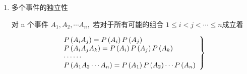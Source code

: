 \begin{enumerate}[1、]
\begin{enumerate}[1)、]
		 	{\bf 推论1：}  若事件独立，且 $ \rm P(B) > 0 $ 则 $ \rm P(A\mid B) = P(A) $
			\begin{myproof}
				由条件概率定义 $ P(A \mid B)=\dfrac{P(A B)}{P(B)}=\dfrac{P(A) P(B)}{P(B)}=P(A) $
			\end{myproof}
		 	
		 	因此，若事件A，B相互独立，由A关于B的条件概率等于无条件概率$ \rm P(A)  $ ，这表示B的发生对于事件A是否发生没有提供任何消息，独立性就是把这种关系从数学上加以严格定义。
		 	
		 	{\bf 推论2：} 若事件A与B独立，则下列各对事件也相互独立： $ \{\bar{A}, B\},\{A, \overline{B}\},\{\bar{A}, \overline{B}\} $
		 	
		 	\begin{myproof}
		 	 \begin{eqnarray}
		 	P(\bar{A} B) & = & P(B-A B)  =  P(B)-P(A B) \\  \notag
		 	& = & P(B)-P(A) P(B) =  P(B)[1-P(A)] \\  \notag
		 	& = & P(\bar{A}) P(B) \notag
			 \end{eqnarray} 	
			\end{myproof} 	 	

		 	所以 $ \bar{A} $与B相互独立，由它立刻推出$  \bar{A} $ 与 $ \bar{B}  $相互独立，
		 	由$ \overline{\overline{A} }  = A$
		 	又推出A与由$ \overline{B} $ 相互独立。
		 	
		 	\item 多个事件的独立性
		 	
		 	\begin{mydef}
				对  n  个事件  $ A_{1}, A_{2}, \cdots A_{n}, $ 若对于所有可能的组合  $ 1 \leqslant i<j<\cdots \le n $成立着
			 \end{mydef}
		 	\begin{eqnarray}
		 	\left.\begin{array}{l}
		 	P\left(A_{i} A_{j}\right)=P\left(A_{i}\right) P\left(A_{j}\right) \\
		 	P\left(A_{i} A_{j} A_{k}\right)=P\left(A_{i}\right) P\left(A_{j}\right) P\left(A_{k}\right) \\
		 	\cdots \cdots\\
		 	P\left(A_{1} A_{2} \cdots A_{n}\right)=P\left(A_{1}\right) P\left(A_{2}\right) \cdots P\left(A_{n}\right)
		 	\end{array}\right\}  \notag
		 	\end{eqnarray}
		 	

\end{enumerate}
\end{enumerate}
